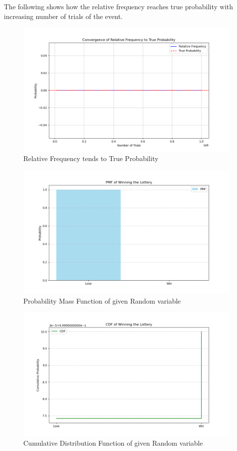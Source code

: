 \documentclass[journal]{IEEEtran}
\numberwithin{equation}{enumi}
\numberwithin{figure}{enumi}
\begin{document}
The following shows how the relative frequency reaches true probability with increasing number of trials of the event.
\newpage
\begin{figure}[h!]
   \centering
   \includegraphics[width=1\columnwidth]{figs/fig.png}
    \caption{Relative Frequency tends to True Probability}
\end{figure}
\begin{figure}[h!]
   \centering
   \includegraphics[width=1\columnwidth]{figs/pmf.png}
    \caption{Probability Mass Function of given Random variable}
\end{figure}
\newpage
\begin{figure}[H]
   \centering
   \includegraphics[width=1\columnwidth]{figs/cdf.png}
    \caption{Cumulative Distribution Function of given Random variable}
\end{figure}
\end{document}
